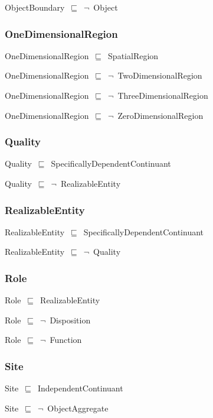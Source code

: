 \documentclass{article}
\begin{document}
ObjectBoundary~\ensuremath{\sqsubseteq}~\ensuremath{\lnot}~Object

\subsubsection*{OneDimensionalRegion}

OneDimensionalRegion~\ensuremath{\sqsubseteq}~SpatialRegion~

OneDimensionalRegion~\ensuremath{\sqsubseteq}~\ensuremath{\lnot}~TwoDimensionalRegion

OneDimensionalRegion~\ensuremath{\sqsubseteq}~\ensuremath{\lnot}~ThreeDimensionalRegion

OneDimensionalRegion~\ensuremath{\sqsubseteq}~\ensuremath{\lnot}~ZeroDimensionalRegion

\subsubsection*{Quality}

Quality~\ensuremath{\sqsubseteq}~SpecificallyDependentContinuant~

Quality~\ensuremath{\sqsubseteq}~\ensuremath{\lnot}~RealizableEntity

\subsubsection*{RealizableEntity}

RealizableEntity~\ensuremath{\sqsubseteq}~SpecificallyDependentContinuant~

RealizableEntity~\ensuremath{\sqsubseteq}~\ensuremath{\lnot}~Quality

\subsubsection*{Role}

Role~\ensuremath{\sqsubseteq}~RealizableEntity~

Role~\ensuremath{\sqsubseteq}~\ensuremath{\lnot}~Disposition

Role~\ensuremath{\sqsubseteq}~\ensuremath{\lnot}~Function

\subsubsection*{Site}

Site~\ensuremath{\sqsubseteq}~IndependentContinuant~

Site~\ensuremath{\sqsubseteq}~\ensuremath{\lnot}~ObjectAggregate
\end{document}
